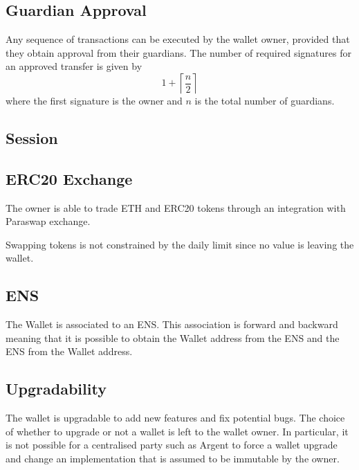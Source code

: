 \documentclass[12pt]{article}
\begin{document}
\subsection{Guardian Approval}
\label{sec:guardian-approval}

Any sequence of transactions can be executed by the wallet owner, provided that they obtain approval from their guardians. The number of required signatures for an approved transfer is given by
\begin{equation*}
    1+\left\lceil {\frac{n}{2}} \right\rceil
\end{equation*}
where the first signature is the owner and $n$ is the total number of guardians.


\subsection{Session}
\label{sec:session}


\subsection{ERC20 Exchange}

The owner is able to trade ETH and ERC20 tokens through an integration with Paraswap exchange.

Swapping tokens is not constrained by the daily limit since no value is leaving the wallet.

\subsection{ENS}

The Wallet is associated to an ENS. This association is forward and backward meaning that it is possible to obtain the Wallet address from the ENS and the ENS from the Wallet address.

\subsection{Upgradability}

The wallet is upgradable to add new features and fix potential bugs. The choice of whether to upgrade or not a wallet is left to the wallet owner. In particular, it is not possible for a centralised party such as Argent to force a wallet upgrade and change an implementation that is assumed to be immutable by the owner.
\end{document}
